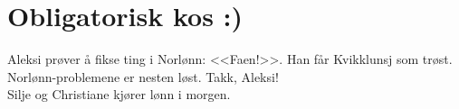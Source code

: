 \documentclass[12pt,norsk]{article}
\begin{document}
\section{Obligatorisk kos :)}
Aleksi prøver å fikse ting i Norlønn: <<Faen!>>. Han får Kvikklunsj som trøst.\\

\noindent Norlønn-problemene er nesten løst. Takk, Aleksi!\\

\noindent Silje og Christiane kjører lønn i morgen.
\end{document}
